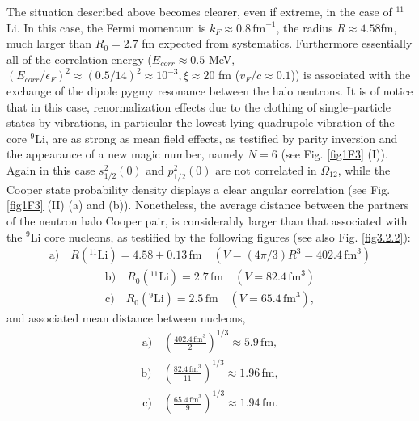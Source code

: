 The situation described above becomes clearer, even if extreme, in the case of $^{11}$Li. In this case, the Fermi momentum is $k_F\approx 0.8\, \text{fm}^{-1}$, the radius $R\approx 4.58 $fm, much larger than $R_0=2.7$ fm expected from systematics. Furthermore essentially all of the correlation energy ($E_{corr}\approx 0.5$ MeV, $(E_{corr}/\epsilon_F)^2\approx (0.5/14)^2\approx 10^{-3}, \xi\approx 20 $ fm ($v_F/c\approx0.1$)) is associated with the exchange of the dipole pygmy resonance between the halo neutrons. It is of notice that in this case, renormalization effects due to the clothing of single--particle states by vibrations, in particular the lowest lying quadrupole vibration of the core $^9$Li, are as strong as mean field effects, as testified by parity inversion and the appearance of a new magic number, namely $N=6$ (see Fig. \ref{fig1F3} (I)). Again in this case $s_{1/2}^2(0)$ and $p_{1/2}^2(0)$ are not correlated in $\Omega_{12}$, while the Cooper state probability density displays a clear angular correlation (see Fig. \ref{fig1F3} (II) (a) and (b)). Nonetheless, the average distance between the partners of the neutron halo Cooper pair, is considerably larger than that associated with the $^9$Li core nucleons, as testified by the following figures (see also Fig. \ref{fig3.2.2}):
\begin{align}\label{eq3.2.21}
 \text{a)}\quad R(^{11}\text{Li})= 4.58\pm 0.13 \,\text{fm}\quad (V=\left(4\pi/3\right)R^3=402.4 \,\text{fm}^3)
\end{align}
\begin{align}
 \text{b)}\quad R_0 (^{11}\text{Li})=2.7\,\text{fm}\quad (V=82.4\,\text{fm}^3)
\end{align}
\begin{align}
 \text{c)}\quad R_0 (^{9}\text{Li})=2.5\,\text{fm}\quad (V=65.4\,\text{fm}^3),
\end{align}
and associated mean distance between nucleons, 
\begin{align}
 \text{a)}\quad \left(\frac{402.4\,\text{fm}^3}{2}\right)^{1/3}\approx 5.9\,\text{fm},
\end{align}
\begin{align}
 \text{b)}\quad \left(\frac{82.4\,\text{fm}^3}{11}\right)^{1/3}\approx 1.96\,\text{fm},
\end{align}
\begin{align}
 \text{c)}\quad \left(\frac{65.4\,\text{fm}^3}{9}\right)^{1/3}\approx 1.94\,\text{fm}.
\end{align}



